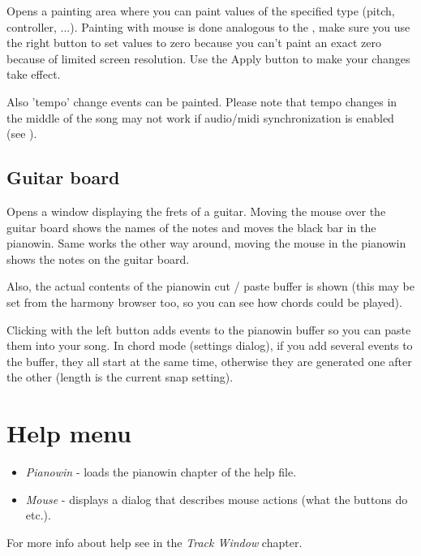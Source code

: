 \documentclass[letterpaper]{report}
\begin{document}
Opens a painting area where you can paint values of the specified type (pitch, controller, ...).
Painting with mouse is done analogous to the , make sure
you use the right button to set values to zero because you can't paint an exact zero because
of limited screen resolution. Use the Apply button to make your changes take effect.

Also 'tempo' change events can be painted. Please note that tempo changes
in the middle of the song may not work if audio/midi synchronization is
enabled (see ).

\subsection{Guitar board}

Opens a window displaying the frets of a guitar. Moving the mouse over the guitar board shows
the names of the notes and moves the black bar in the pianowin. Same works the other way around,
moving the mouse in the pianowin shows the notes on the guitar board.

Also, the actual contents of the pianowin cut / paste buffer is shown (this may be set from the
harmony browser too, so you can see how chords could be played).

Clicking with the left button adds events to the pianowin buffer so you can paste them into
your song. In chord mode (settings dialog), if you add several events to the buffer, they all
start at the same time, otherwise they are generated one after the other (length is the
current snap setting).


\section{Help menu}

\begin{itemize}

\item {\em Pianowin} - loads the pianowin chapter of the help file.

\item {\em Mouse} - displays a dialog that describes mouse actions (what the buttons
do etc.).

\end{itemize}

For more info about help see  in the {\em Track Window} chapter.
\end{document}
